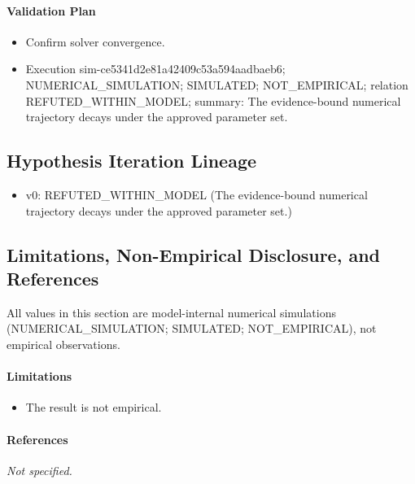 \documentclass[11pt]{article}
\begin{document}
\paragraph{Validation Plan}
\begin{itemize}
\item Confirm solver convergence.
\end{itemize}

\begin{itemize}
\item Execution sim-ce5341d2e81a42409c53a594aadbaeb6; NUMERICAL\_SIMULATION; SIMULATED; NOT\_EMPIRICAL; relation REFUTED\_WITHIN\_MODEL; summary: The evidence-bound numerical trajectory decays under the approved parameter set.
\end{itemize}

\subsection{Hypothesis Iteration Lineage}

\begin{itemize}
\item v0: REFUTED\_WITHIN\_MODEL (The evidence-bound numerical trajectory decays under the approved parameter set.)
\end{itemize}

\subsection{Limitations, Non-Empirical Disclosure, and References}

\noindent All values in this section are model-internal numerical simulations (NUMERICAL\_SIMULATION; SIMULATED; NOT\_EMPIRICAL), not empirical observations.

\paragraph{Limitations}
\begin{itemize}
\item The result is not empirical.
\end{itemize}

\paragraph{References}
\emph{Not specified.}
\end{document}
